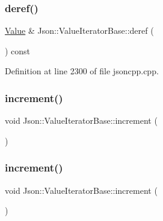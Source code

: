 \hypertarget{class_json_1_1_value_iterator_base_aa5b75c9514a30ba2ea3c9a35c165c18e}{}\label{class_json_1_1_value_iterator_base_aa5b75c9514a30ba2ea3c9a35c165c18e} 
\subsubsection{\texorpdfstring{deref()}{deref()}\hspace{0.1cm}{\footnotesize\ttfamily [2/2]}}
{\footnotesize\ttfamily \hyperlink{class_json_1_1_value}{Value} \& Json\+::\+Value\+Iterator\+Base\+::deref (\begin{DoxyParamCaption}{ }\end{DoxyParamCaption}) const\hspace{0.3cm}{\ttfamily [protected]}}



Definition at line 2300 of file jsoncpp.\+cpp.

\hypertarget{class_json_1_1_value_iterator_base_afe58f9534e1fd2033419fd9fe244551e}{}\label{class_json_1_1_value_iterator_base_afe58f9534e1fd2033419fd9fe244551e} 
\subsubsection{\texorpdfstring{increment()}{increment()}\hspace{0.1cm}{\footnotesize\ttfamily [1/2]}}
{\footnotesize\ttfamily void Json\+::\+Value\+Iterator\+Base\+::increment (\begin{DoxyParamCaption}{ }\end{DoxyParamCaption})\hspace{0.3cm}{\ttfamily [protected]}}

\hypertarget{class_json_1_1_value_iterator_base_afe58f9534e1fd2033419fd9fe244551e}{}\label{class_json_1_1_value_iterator_base_afe58f9534e1fd2033419fd9fe244551e} 
\subsubsection{\texorpdfstring{increment()}{increment()}\hspace{0.1cm}{\footnotesize\ttfamily [2/2]}}
{\footnotesize\ttfamily void Json\+::\+Value\+Iterator\+Base\+::increment (\begin{DoxyParamCaption}{ }\end{DoxyParamCaption})\hspace{0.3cm}{\ttfamily [protected]}}



